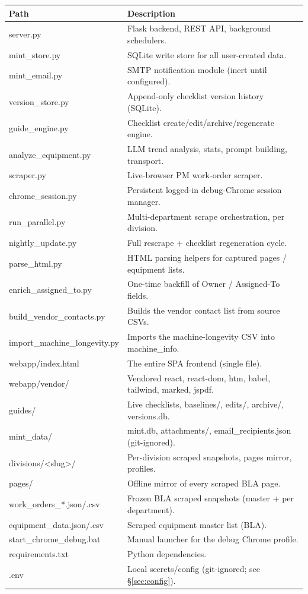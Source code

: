 \documentclass[11pt,a4paper]{article}
\begin{document}
\begin{longtable}{@{}>{\ttfamily}p{}p{}@{}}
\toprule
\textbf{Path} & \textbf{Description} \\
\midrule
\endhead
server.py & Flask backend, REST API, background schedulers. \\
mint\_store.py & SQLite write store for all user-created data. \\
mint\_email.py & SMTP notification module (inert until configured). \\
version\_store.py & Append-only checklist version history (SQLite). \\
guide\_engine.py & Checklist create/edit/archive/regenerate engine. \\
analyze\_equipment.py & LLM trend analysis, stats, prompt building, transport. \\
scraper.py & Live-browser PM work-order scraper. \\
chrome\_session.py & Persistent logged-in debug-Chrome session manager. \\
run\_parallel.py & Multi-department scrape orchestration, per division. \\
nightly\_update.py & Full rescrape + checklist regeneration cycle. \\
parse\_html.py & HTML parsing helpers for captured pages / equipment lists. \\
enrich\_assigned\_to.py & One-time backfill of Owner / Assigned-To fields. \\
build\_vendor\_contacts.py & Builds the vendor contact list from source CSVs. \\
import\_machine\_longevity.py & Imports the machine-longevity CSV into machine\_info. \\
webapp/index.html & The entire SPA frontend (single file). \\
webapp/vendor/ & Vendored react, react-dom, htm, babel, tailwind, marked, jspdf. \\
guides/ & Live checklists, baselines/, edits/, archive/, versions.db. \\
mint\_data/ & mint.db, attachments/, email\_recipients.json (git-ignored). \\
divisions/<slug>/ & Per-division scraped snapshots, pages mirror, profiles. \\
pages/ & Offline mirror of every scraped BLA page. \\
work\_orders\_*.json/.csv & Frozen BLA scraped snapshots (master + per department). \\
equipment\_data.json/.csv & Scraped equipment master list (BLA). \\
start\_chrome\_debug.bat & Manual launcher for the debug Chrome profile. \\
requirements.txt & Python dependencies. \\
.env & Local secrets/config (git-ignored; see \S\ref{sec:config}). \\
\bottomrule
\end{longtable}
\end{document}
